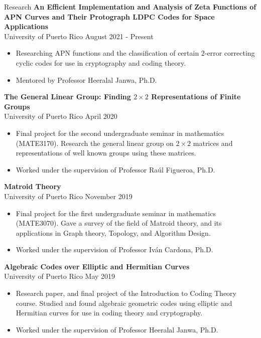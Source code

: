 \documentclass{resume} %
\begin{document}
\begin{rSection}{Research}
    \textbf{An Efficient Implementation and Analysis of Zeta Functions of APN Curves
and Their Protograph LDPC Codes for Space Applications} \\
    University of Puerto Rico \hfill{August 2021 - Present}
    \begin{itemize}
        \item Researching APN functions and the classification of certain
            $2$-error correcting cyclic codes for use in cryptography and coding
            theory.

        \item Mentored by Professor Heeralal Janwa, Ph.D.
    \end{itemize}

    \textbf{The General Linear Group: Finding $2 \times 2$
    Representations of Finite Groups} \\
    University of Puerto Rico \hfill{April 2020}
    \begin{itemize}
        \item Final project for the second undergraduate seminar in mathematics
            (MATE3170). Research the general linear group on $2 \times 2$
            matrices and representations of well known groups using these
            matrices.

        \item Worked under the supervision of Professor Ra\'ul Figueroa, Ph.D.
    \end{itemize}

    \textbf{Matroid Theory}  \\
    University of Puerto Rico \hfill{November 2019}
    \begin{itemize}
        \item Final project for the first undergraduate seminar in mathematics
            (MATE3070). Gave a survey of the field of Matroid theory, and its
            applications in Graph theory, Topology, and Algorithm Design.

        \item Worked under the supervision of Professor Iv\'an Cardona, Ph.D.
    \end{itemize}

    \textbf{Algebraic Codes over Elliptic and Hermitian
    Curves} \\
    University of Puerto Rico \hfill{May 2019}
    \begin{itemize}
        \item Research paper, and final project of the Introduction to Coding
            Theory course. Studied and found algebraic geometric codes using
            elliptic and Hermitian curves for use in coding theory and
            cryptography.

        \item Worked under the supervision of Professor Heeralal Janwa, Ph.D.
    \end{itemize}
\end{rSection}
\end{document}
